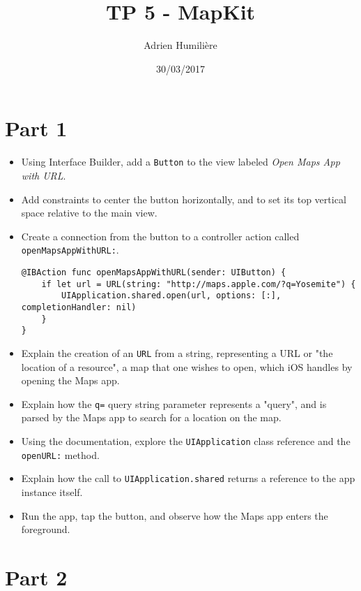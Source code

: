 \documentclass[a4paper,11pt]{scrartcl}
\begin{document}
\newcommand{\mytitle}{TP 5 - MapKit}
\title{\mytitle}
\author{Adrien Humilière}
\date{30/03/2017}

\maketitle

\section*{Part 1}

\begin{itemize}
\item Using Interface Builder, add a \texttt{Button} to the view labeled \textit{Open Maps App with URL}.
\item Add constraints to center the button horizontally, and to set its top vertical space relative to the main view.
\item Create a connection from the button to a controller action called \texttt{openMapsAppWithURL:}.
\begin{lstlisting}
@IBAction func openMapsAppWithURL(sender: UIButton) {
	if let url = URL(string: "http://maps.apple.com/?q=Yosemite") {
		UIApplication.shared.open(url, options: [:], completionHandler: nil)
	}
}
\end{lstlisting}
\item Explain the creation of an \texttt{URL} from a string, representing a URL or "the location of a resource", a map that one wishes to open, which iOS handles by opening the Maps app.
\item Explain how the \texttt{q=} query string parameter represents a "query", and is parsed by the Maps app to search for a location on the map.
\item Using the documentation, explore the \texttt{UIApplication} class reference and the \texttt{openURL:} method.
\item Explain how the call to \texttt{UIApplication.shared} returns a reference to the app instance itself.
\item Run the app, tap the button, and observe how the Maps app enters the foreground.
\end{itemize}

\section*{Part 2}
\end{document}

